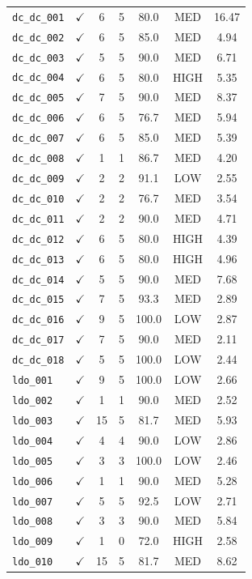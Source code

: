 \begin{longtable}{@{\extracolsep{\fill}}p{2.1cm}cccccc@{}}
\texttt{dc\_dc\_001} & $\checkmark$ & 6 & 5 & 80.0 & MED & 16.47 \\
\texttt{dc\_dc\_002} & $\checkmark$ & 6 & 5 & 85.0 & MED & 4.94 \\
\texttt{dc\_dc\_003} & $\checkmark$ & 5 & 5 & 90.0 & MED & 6.71 \\
\texttt{dc\_dc\_004} & $\checkmark$ & 6 & 5 & 80.0 & HIGH & 5.35 \\
\texttt{dc\_dc\_005} & $\checkmark$ & 7 & 5 & 90.0 & MED & 8.37 \\
\texttt{dc\_dc\_006} & $\checkmark$ & 6 & 5 & 76.7 & MED & 5.94 \\
\texttt{dc\_dc\_007} & $\checkmark$ & 6 & 5 & 85.0 & MED & 5.39 \\
\texttt{dc\_dc\_008} & $\checkmark$ & 1 & 1 & 86.7 & MED & 4.20 \\
\texttt{dc\_dc\_009} & $\checkmark$ & 2 & 2 & 91.1 & LOW & 2.55 \\
\texttt{dc\_dc\_010} & $\checkmark$ & 2 & 2 & 76.7 & MED & 3.54 \\
\texttt{dc\_dc\_011} & $\checkmark$ & 2 & 2 & 90.0 & MED & 4.71 \\
\texttt{dc\_dc\_012} & $\checkmark$ & 6 & 5 & 80.0 & HIGH & 4.39 \\
\texttt{dc\_dc\_013} & $\checkmark$ & 6 & 5 & 80.0 & HIGH & 4.96 \\
\texttt{dc\_dc\_014} & $\checkmark$ & 5 & 5 & 90.0 & MED & 7.68 \\
\texttt{dc\_dc\_015} & $\checkmark$ & 7 & 5 & 93.3 & MED & 2.89 \\
\texttt{dc\_dc\_016} & $\checkmark$ & 9 & 5 & 100.0 & LOW & 2.87 \\
\texttt{dc\_dc\_017} & $\checkmark$ & 7 & 5 & 90.0 & MED & 2.11 \\
\texttt{dc\_dc\_018} & $\checkmark$ & 5 & 5 & 100.0 & LOW & 2.44 \\
\texttt{ldo\_001} & $\checkmark$ & 9 & 5 & 100.0 & LOW & 2.66 \\
\texttt{ldo\_002} & $\checkmark$ & 1 & 1 & 90.0 & MED & 2.52 \\
\texttt{ldo\_003} & $\checkmark$ & 15 & 5 & 81.7 & MED & 5.93 \\
\texttt{ldo\_004} & $\checkmark$ & 4 & 4 & 90.0 & LOW & 2.86 \\
\texttt{ldo\_005} & $\checkmark$ & 3 & 3 & 100.0 & LOW & 2.46 \\
\texttt{ldo\_006} & $\checkmark$ & 1 & 1 & 90.0 & MED & 5.28 \\
\texttt{ldo\_007} & $\checkmark$ & 5 & 5 & 92.5 & LOW & 2.71 \\
\texttt{ldo\_008} & $\checkmark$ & 3 & 3 & 90.0 & MED & 5.84 \\
\texttt{ldo\_009} & $\checkmark$ & 1 & 0 & 72.0 & HIGH & 2.58 \\
\texttt{ldo\_010} & $\checkmark$ & 15 & 5 & 81.7 & MED & 8.62 \\
\end{longtable}

\normalsize
